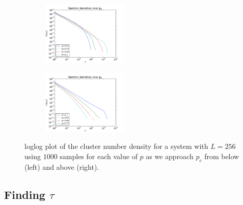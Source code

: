 \documentclass[a4paper,reprint,floatfix,amsmath,amssymb,aps,pra]{revtex4-1}
\begin{document}
\begin{figure}
  \centering
  \begin{subfigure}
  \centering
  \includegraphics[width=0.45\textwidth]{../percolation/results/1e/n-vs-s-L256-nsamples10000-frombelow.pdf}
  \end{subfigure}
  \begin{subfigure}
  \centering
  \includegraphics[width=0.45\textwidth]{../percolation/results/1e/n-vs-s-L256-nsamples10000-fromabove.pdf}
  \end{subfigure}
  \caption{loglog plot of the cluster number density for a system with $L=256$ using $1000$ samples for each value of $p$ as we approach $p_c$ from below (left) and above (right).}
  \label{fig:cluster-number-density}
\end{figure}

\subsection{Finding $\tau$}
\end{document}

